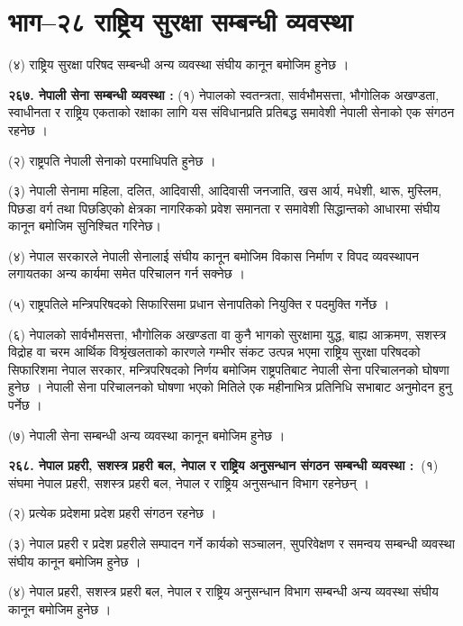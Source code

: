 \section{भाग–२८ राष्ट्रिय सुरक्षा सम्बन्धी व्यवस्था}

(४) राष्ट्रिय सुरक्षा परिषद सम्बन्धी अन्य व्यवस्था संघीय कानून बमोजिम हुनेछ ।

\textbf{२६७. नेपाली सेना सम्बन्धी व्यवस्था :} (१) नेपालको स्वतन्त्रता, सार्वभौमसत्ता, भौगोलिक अखण्डता, स्वाधीनता र राष्ट्रिय एकताको रक्षाका लागि यस संविधानप्रति प्रतिबद्ध समावेशी नेपाली सेनाको एक संगठन रहनेछ ।

(२) राष्ट्रपति नेपाली सेनाको परमाधिपति हुनेछ ।

(३) नेपाली सेनामा महिला, दलित, आदिवासी, आदिवासी जनजाति, खस आर्य, मधेशी, थारू, मुस्लिम, पिछडा वर्ग तथा पिछडिएको क्षेत्रका नागरिकको प्रवेश समानता र समावेशी सिद्धान्तको आधारमा संघीय कानून बमोजिम सुनिश्चित गरिनेछ।

(४) नेपाल सरकारले नेपाली सेनालाई संघीय कानून बमोजिम विकास निर्माण र विपद व्यवस्थापन लगायतका अन्य कार्यमा समेत परिचालन गर्न सक्नेछ ।

(५) राष्ट्रपतिले मन्त्रिपरिषदको सिफारिसमा प्रधान सेनापतिको नियुक्ति र पदमुक्ति गर्नेछ ।

(६) नेपालको सार्वभौमसत्ता, भौगोलिक अखण्डता वा कुनै भागको सुरक्षामा युद्ध, बाह्य आक्रमण, सशस्त्र विद्रोह वा चरम आर्थिक विश्रृंखलताको कारणले गम्भीर संकट उत्पन्न भएमा राष्ट्रिय सुरक्षा परिषदको सिफारिशमा नेपाल सरकार, मन्त्रिपरिषदको निर्णय बमोजिम राष्ट्रपतिबाट नेपाली सेना परिचालनको घोषणा हुनेछ । नेपाली सेना परिचालनको घोषणा भएको मितिले एक महीनाभित्र प्रतिनिधि सभाबाट अनुमोदन हुनु पर्नेछ ।

(७) नेपाली सेना सम्बन्धी अन्य व्यवस्था कानून बमोजिम हुनेछ ।

\textbf{२६८. नेपाल प्रहरी, सशस्त्र प्रहरी बल, नेपाल र राष्ट्रिय अनुसन्धान संगठन सम्बन्धी व्यवस्था : }(१) संघमा नेपाल प्रहरी, सशस्त्र प्रहरी बल, नेपाल र राष्ट्रिय अनुसन्धान विभाग रहनेछन् ।

(२) प्रत्येक प्रदेशमा प्रदेश प्रहरी संगठन रहनेछ ।

(३) नेपाल प्रहरी र प्रदेश प्रहरीले सम्पादन गर्ने कार्यको सञ्चालन, सुपरिवेक्षण र समन्वय सम्बन्धी व्यवस्था संघीय कानून बमोजिम हुनेछ ।

(४) नेपाल प्रहरी, सशस्त्र प्रहरी बल, नेपाल र राष्ट्रिय अनुसन्धान विभाग सम्बन्धी अन्य व्यवस्था संघीय कानून बमोजिम हुनेछ ।
